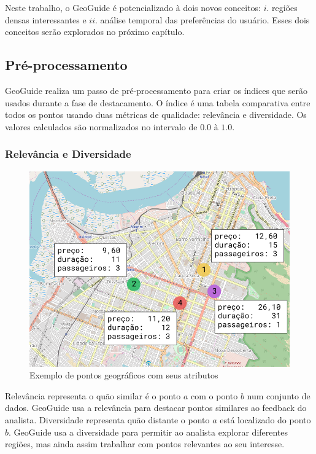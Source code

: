 Neste trabalho, o GeoGuide é potencializado à dois novos conceitos: $i$. regiões densas interessantes e $ii$. análise temporal das preferências do usuário. Esses dois conceitos serão explorados no próximo capítulo.

\subsection{Pré-processamento}

GeoGuide realiza um passo de pré-processamento para criar os índices que serão usados durante a fase de destacamento. O índice é uma tabela comparativa entre todos os pontos usando duas métricas de qualidade: relevância e diversidade. Os valores calculados são normalizados no intervalo de $0.0$ à $1.0$.

\subsubsection{Relevância e Diversidade}

\begin{figure}[t]
	\caption{Exemplo de pontos geográficos com seus atributos}
	\label{fig:exemplo-pontos}
	\centering
	\includegraphics[width=\columnwidth]{imagens/exemplo-de-pontos}
	\mfonte
\end{figure}

Relevância representa o quão similar é o ponto $a$ com o ponto $b$ num conjunto de dados. GeoGuide usa a relevância para destacar pontos similares ao feedback do analista. Diversidade representa quão distante o ponto $a$ está localizado do ponto $b$. GeoGuide usa a diversidade para permitir ao analista explorar diferentes regiões, mas ainda assim trabalhar com pontos relevantes ao seu interesse.

